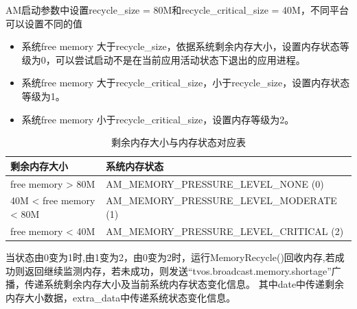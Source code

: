 AM启动参数中设置recycle\_size = 80M和recycle\_critical\_size = 40M，不同平台可以设置不同的值\par
\begin{itemize}
  \item 系统free memory 大于recycle\_size，依据系统剩余内存大小，设置内存状态等级为0，可以尝试启动不是在当前应用活动状态下退出的应用进程。
  \item 系统free memory 大于recycle\_critical\_size，小于recycle\_size，设置内存状态等级为1。
  \item 系统free memory 小于recycle\_critical\_size，设置内存等级为2。
\end{itemize}
\begin{table}[!htbp]
  \begin{center}
  \caption{剩余内存大小与内存状态对应表}
  \label{biao}
  \begin{tabular}{|l|l|}      
  \hline                     
  剩余内存大小 & 系统内存状态\\
  \hline        
  free memory > 80M & AM\_MEMORY\_PRESSURE\_LEVEL\_NONE (0) \\  \hline 
  40M < free memory < 80M & AM\_MEMORY\_PRESSURE\_LEVEL\_MODERATE (1) \\  \hline 
  free memory < 40M & AM\_MEMORY\_PRESSURE\_LEVEL\_CRITICAL (2) \\
  \hline
  \end{tabular}
  \end{center}
  \end{table}
\par 当状态由0变为1时,由1变为2，由0变为2时，运行MemoryRecycle()回收内存,若成功则返回继续监测内存，若未成功，则发送“tvos.broadcast.memory.shortage”广播，传递系统剩余内存大小及当前系统内存状态变化信息。
其中date中传递剩余内存大小数据，extra\_data中传递系统状态变化信息。
